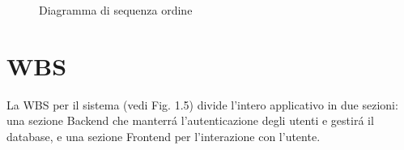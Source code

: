 \documentclass[../../documentazione.tex]{subfiles}
\begin{document}
\begin{sidewaysfigure}[ht]
{
        }
        \caption{Diagramma di sequenza ordine}
    \end{sidewaysfigure}

    \clearpage
    \section{WBS}\label{sec:wbs}
    La WBS per il sistema (vedi Fig. 1.5) divide l'intero applicativo in due sezioni:
    una sezione Backend che manterrá l'autenticazione degli utenti e gestirá il database,
    e una sezione Frontend per l'interazione con l'utente.
\end{document}
